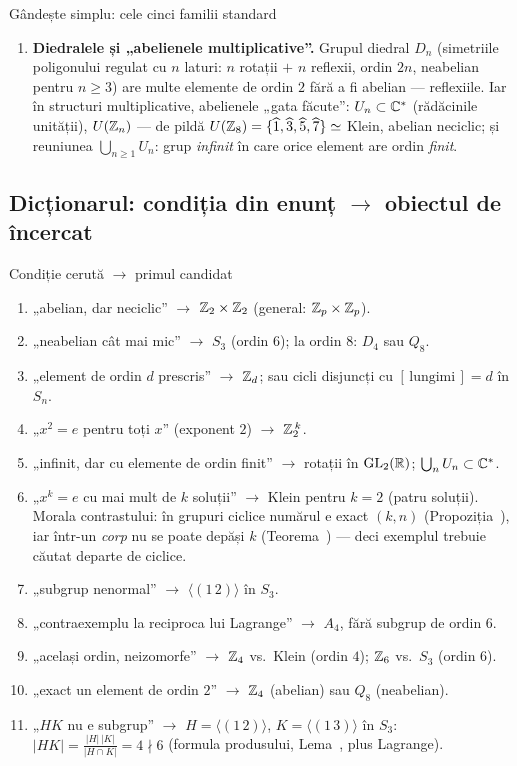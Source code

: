 \begin{tehbox}{Gândește simplu: cele cinci familii standard}
\begin{enumerate}[leftmargin=*, itemsep=2pt]
\item \textbf{Diedralele și „abelienele multiplicative''.} Grupul diedral $D_n$ (simetriile poligonului regulat cu $n$ laturi: $n$ rotații $+$ $n$ reflexii, ordin $2n$, neabelian pentru $n\ge3$) are multe elemente de ordin $2$ fără a fi abelian --- reflexiile. Iar în structuri multiplicative, abelienele „gata făcute'': $U_n\subset\mathbb{C}^*$ (rădăcinile unității), $U(\mathbb{Z}_n)$ --- de pildă $U(\mathbb{Z}_8)=\{\widehat{1},\widehat{3},\widehat{5},\widehat{7}\}\simeq$ Klein, abelian neciclic; și reuniunea $\bigcup_{n\ge1}U_n$: grup \emph{infinit} în care orice element are ordin \emph{finit}.
\end{enumerate}
\end{tehbox}

\subsection{Dicționarul: condiția din enunț $\to$ obiectul de încercat}

\begin{tehbox}{Condiție cerută $\to$ primul candidat}
\begin{enumerate}[leftmargin=*, itemsep=1pt]
\item „abelian, dar neciclic'' $\to$ $\mathbb{Z}_2\times\mathbb{Z}_2$ (general: $\mathbb{Z}_p\times\mathbb{Z}_p$).
\item „neabelian cât mai mic'' $\to$ $S_3$ (ordin $6$); la ordin $8$: $D_4$ sau $Q_8$.
\item „element de ordin $d$ prescris'' $\to$ $\mathbb{Z}_d$; sau cicli disjuncți cu $[\,\text{lungimi}\,]=d$ în $S_n$.
\item „$x^2=e$ pentru toți $x$'' (exponent $2$) $\to$ $\mathbb{Z}_2^{\,k}$.
\item „infinit, dar cu elemente de ordin finit'' $\to$ rotații în $\mathrm{GL}_2(\mathbb{R})$; $\bigcup_nU_n\subset\mathbb{C}^*$.
\item „$x^k=e$ cu mai mult de $k$ soluții'' $\to$ Klein pentru $k=2$ (patru soluții). Morala contrastului: în grupuri ciclice numărul e exact $(k,n)$ (Propoziția~), iar într-un \emph{corp} nu se poate depăși $k$ (Teorema~) --- deci exemplul trebuie căutat departe de ciclice.
\item „subgrup nenormal'' $\to$ $\langle(1\,2)\rangle$ în $S_3$.
\item „contraexemplu la reciproca lui Lagrange'' $\to$ $A_4$, fără subgrup de ordin $6$.
\item „același ordin, neizomorfe'' $\to$ $\mathbb{Z}_4$ vs.\ Klein (ordin $4$); $\mathbb{Z}_6$ vs.\ $S_3$ (ordin $6$).
\item „exact un element de ordin $2$'' $\to$ $\mathbb{Z}_4$ (abelian) sau $Q_8$ (neabelian).
\item „$HK$ nu e subgrup'' $\to$ $H=\langle(1\,2)\rangle$, $K=\langle(1\,3)\rangle$ în $S_3$: $|HK|=\frac{|H|\,|K|}{|H\cap K|}=4\nmid6$ (formula produsului, Lema~, plus Lagrange).
\end{enumerate}
\end{tehbox}

